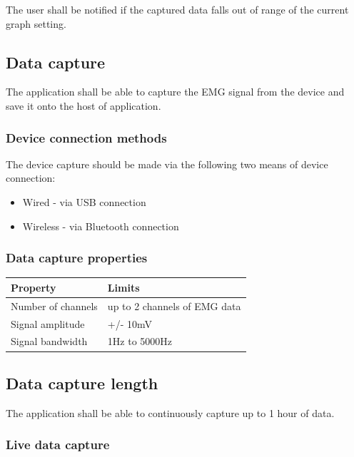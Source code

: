 \documentclass[12pt,a4paper]{article}
\begin{document}
The user shall be notified if the captured data falls out of range of the current graph setting.

\subsection{Data capture}

The application shall be able to capture the EMG signal from the device and save it onto the host of application.

\subsubsection{Device connection methods}

The device capture should be made via the following two means of device connection:

\begin{itemize}
	\item Wired - via USB connection
	\item Wireless - via Bluetooth connection
\end{itemize}

\subsubsection{Data capture properties}

\begin{table}[htbp]
	\centering
	
	\begin{tabular}{|l|l|}
		\hline
		\textbf{Property}  & \textbf{Limits} \\
		\hline
		Number of channels & up to 2 channels of EMG data\\
		\hline
		Signal amplitude & +/- 10mV \\
		\hline
		Signal bandwidth & 1Hz to 5000Hz \\
		\hline
	\end{tabular}
\end{table}

\subsection{Data capture length}

The application shall be able to continuously capture up to 1 hour of data.

\subsubsection{Live data capture}
\end{document}
